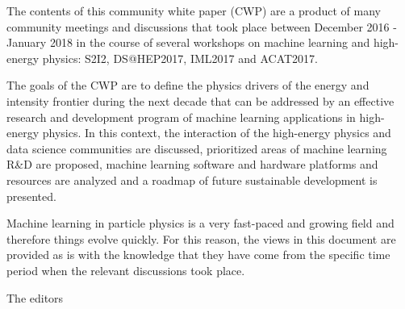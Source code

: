 The contents of this community white paper (CWP) are a product of many community meetings and discussions that took place between December 2016 - January 2018 in the course of several workshops on machine learning and high-energy physics: S2I2, DS@HEP2017, IML2017 and ACAT2017.
 

The goals of the CWP are to define the physics drivers of the energy and intensity frontier during the next decade that can be addressed by an effective research and development program of machine learning applications in high-energy physics. In this context, the interaction of the high-energy physics and data science communities are discussed, prioritized areas of machine learning R&D are proposed, machine learning software and hardware platforms and resources are analyzed and a roadmap of future sustainable development is presented.    

Machine learning in particle physics is a very fast-paced and growing field and therefore things evolve quickly. For this reason, the views in this document are provided as is with the knowledge that they have come from the specific time period when the relevant discussions took place. 

The editors
